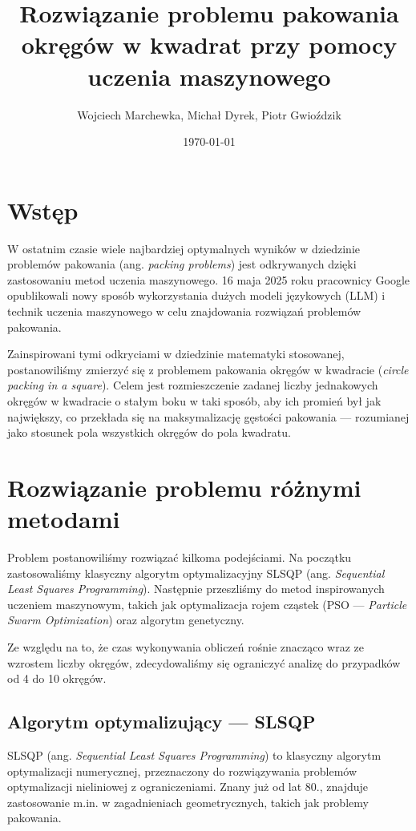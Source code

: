 \documentclass{article}
\title{Rozwiązanie problemu pakowania okręgów w kwadrat przy pomocy uczenia maszynowego}
\author{Wojciech Marchewka, Michał Dyrek, Piotr Gwioździk}
\date{\today}
\begin{document}
\maketitle

\section{Wstęp}

W ostatnim czasie wiele najbardziej optymalnych wyników w dziedzinie problemów pakowania (ang. \textit{packing problems}) jest odkrywanych dzięki zastosowaniu metod uczenia maszynowego. 16 maja 2025 roku pracownicy Google opublikowali nowy sposób wykorzystania dużych modeli językowych (LLM) i technik uczenia maszynowego w celu znajdowania rozwiązań problemów pakowania.

Zainspirowani tymi odkryciami w dziedzinie matematyki stosowanej, postanowiliśmy zmierzyć się z problemem pakowania okręgów w kwadracie (\textit{circle packing in a square}). Celem jest rozmieszczenie zadanej liczby jednakowych okręgów w kwadracie o stałym boku w taki sposób, aby ich promień był jak największy, co przekłada się na maksymalizację gęstości pakowania — rozumianej jako stosunek pola wszystkich okręgów do pola kwadratu.

\section{Rozwiązanie problemu różnymi metodami}

Problem postanowiliśmy rozwiązać kilkoma podejściami. Na początku zastosowaliśmy klasyczny algorytm optymalizacyjny SLSQP (ang. \textit{Sequential Least Squares Programming}). Następnie przeszliśmy do metod inspirowanych uczeniem maszynowym, takich jak optymalizacja rojem cząstek (PSO — \textit{Particle Swarm Optimization}) oraz algorytm genetyczny.

Ze względu na to, że czas wykonywania obliczeń rośnie znacząco wraz ze wzrostem liczby okręgów, zdecydowaliśmy się ograniczyć analizę do przypadków od 4 do 10 okręgów.

\subsection{Algorytm optymalizujący — SLSQP}

SLSQP (ang. \textit{Sequential Least Squares Programming}) to klasyczny algorytm optymalizacji numerycznej, przeznaczony do rozwiązywania problemów optymalizacji nieliniowej z ograniczeniami. Znany już od lat 80., znajduje zastosowanie m.in. w zagadnieniach geometrycznych, takich jak problemy pakowania.
\end{document}
